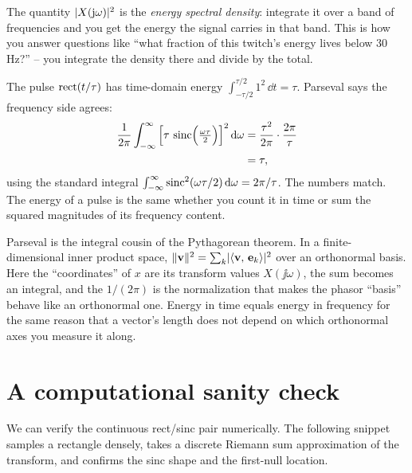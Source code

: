 The quantity $\lvert X(\mathrm{j}\omega)\rvert^2$ is the \emph{energy spectral density}: integrate it
over a band of frequencies and you get the energy the signal carries in that band. This
is how you answer questions like ``what fraction of this twitch's energy lives below
$30\,$Hz?'' -- you integrate the density there and divide by the total.

\begin{example}
\label{ch07:ex-parseval}
The pulse $\operatorname{rect}(t/\tau)$ has time-domain energy $\int_{-\tau/2}^{\tau/2}1^2\,\dd t = \tau$.
Parseval says the frequency side agrees:
\begin{align*}
\frac{1}{2\pi}\int_{-\infty}^{\infty}\left[\tau\,\operatorname{sinc}\!\Big(\tfrac{\omega\tau}{2}\Big)\right]^2\mathrm{d}\omega
&= \frac{\tau^2}{2\pi}\cdot\frac{2\pi}{\tau} \\
&= \tau,
\end{align*}
using the standard integral $\int_{-\infty}^{\infty}\operatorname{sinc}^2(\omega\tau/2)\,\mathrm{d}\omega = 2\pi/\tau$.
The numbers match. The energy of a pulse is the same whether you count it in time or sum
the squared magnitudes of its frequency content.
\end{example}

\begin{connectionbox}
Parseval is the integral cousin of the Pythagorean theorem. In a finite-dimensional inner
product space, $\lVert\mathbf{v}\rVert^2 = \sum_k\lvert\langle \mathbf{v},\, \mathbf{e}_k \rangle\rvert^2$ over an
orthonormal basis. Here the ``coordinates'' of $x$ are its transform values
$X(\jj\omega)$, the sum becomes an integral, and the $1/(2\pi)$ is the normalization that
makes the phasor ``basis'' behave like an orthonormal one. Energy in time equals energy
in frequency for the same reason that a vector's length does not depend on which
orthonormal axes you measure it along.
\end{connectionbox}

\section{A computational sanity check}
\label{ch07:numeric}

We can verify the continuous rect/sinc pair numerically. The following snippet samples a
rectangle densely, takes a discrete Riemann sum approximation of the transform, and confirms the sinc shape and the
first-null location.

